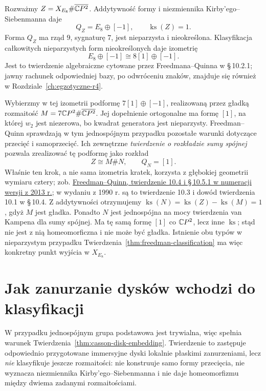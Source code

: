 \begin{przyklad}
\label{prz:freedman-odd-twin}
Rozważmy $Z=X_{E_8}\#\overline{\mathbb{C} P^2}$. Addytywność
formy i niezmiennika Kirby'ego--Siebenmanna daje
\[
 Q_Z=E_8\oplus[-1],\qquad
 \operatorname{ks}(Z)=1.
\]
Forma $Q_Z$ ma rząd $9$, sygnaturę $7$, jest
nieparzysta i nieokreślona. Klasyfikacja całkowitych
nieparzystych form nieokreślonych daje izometrię
\[
 E_8\oplus[-1]\cong8[1]\oplus[-1].
\]
Jest to twierdzenie algebraiczne cytowane przez
Freedmana--Quinna w \S\,10.2.1; jawny rachunek
odpowiedniej bazy, po odwróceniu znaków, znajduje się
również w Rozdziale~\ref{ch:egzotyczne-r4}.

Wybierzmy w tej izometrii podformę
$7[1]\oplus[-1]$, realizowaną przez gładką
rozmaitość $M=7\mathbb{C} P^2\#\overline{\mathbb{C} P^2}$.
Jej dopełnienie ortogonalne ma formę $[1]$,
na której $w_2$ jest niezerowa, bo kwadrat
generatora jest nieparzysty. Freedman--Quinn
sprawdzają w tym jednospójnym przypadku
pozostałe warunki dotyczące przecięć
i samoprzecięć. Ich zewnętrzne
\emph{twierdzenie o rozkładzie sumy spójnej}
pozwala zrealizować tę podformę jako rozkład
\[
 Z\cong M\#N,\qquad Q_N=[1].
\]
Właśnie ten krok, a nie sama izometria kratek,
korzysta z głębokiej geometrii wymiaru cztery;
zob. \href{https://archive.mpim-bonn.mpg.de/4789/2/FreedmanQuinn-TopologyOf4Manifolds-Reformatted2013.pdf}
{Freedman--Quinn, twierdzenie 10.4 i \S\,10.5.1
w numeracji wersji z 2013 r.}; w wydaniu z 1990 r.
są to twierdzenie 10.3 i dowód twierdzenia 10.1
w \S\,10.4.
Z addytywności otrzymujemy
$\operatorname{ks}(N)=\operatorname{ks}(Z)-
\operatorname{ks}(M)=1$, gdyż $M$ jest gładka.
Ponadto $N$ jest jednospójna na mocy twierdzenia
van Kampena dla sumy spójnej. Ma tę samą formę
$[1]$ co $\mathbb{C} P^2$, lecz inne $\operatorname{ks}$;
stąd nie jest z nią homeomorficzna i nie może
być gładka. Istnienie obu typów w nieparzystym
przypadku Twierdzenia~\ref{thm:freedman-classification}
ma więc konkretny punkt wyjścia w $X_{E_8}$.
\end{przyklad}

\section{Jak zanurzanie dysków wchodzi do klasyfikacji}
\label{sec:freedman-route}

W przypadku jednospójnym grupa podstawowa jest
trywialna, więc spełnia warunek
Twierdzenia~\ref{thm:casson-disk-embedding}.
Twierdzenie to zastępuje odpowiednio przygotowane
immersyjne dyski lokalnie płaskimi zanurzeniami, lecz
\emph{nie} klasyfikuje jeszcze rozmaitości: nie
konstruuje samo formy przecięcia, nie wyznacza
niezmiennika Kirby'ego--Siebenmanna i nie daje
homeomorfizmu między dwiema zadanymi rozmaitościami.

